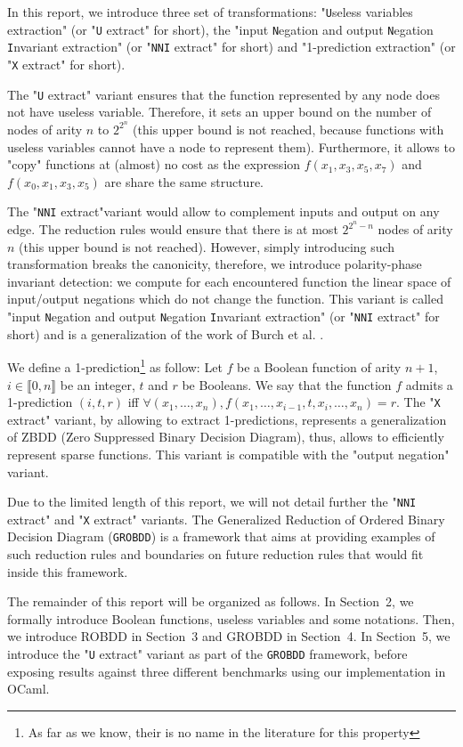 \documentclass[a4paper,10pt]{article}
\newcommand{\Uextract}{"\texttt{U}seless variables extraction"}
\newcommand{\uextract}{"\texttt{U} extract"}
\newcommand{\NNIextract}{"input \texttt{N}egation and output \texttt{N}egation \texttt{I}nvariant extraction"}
\newcommand{\nniextract}{"\texttt{NNI} extract"}
\newcommand{\Xextract}{"1-prediction extraction"}
\newcommand{\xextract}{"\texttt{X} extract"}
\newcommand{\GroBdd}{\texttt{GROBDD}}
\begin{document}
In this report, we introduce three set of transformations: \Uextract{} (or \uextract{} for short), the \NNIextract{} (or \nniextract{} for short) and \Xextract{} (or \xextract{} for short).


The \uextract{} variant ensures that the function represented by any node does not have useless variable.
Therefore, it sets an upper bound on the number of nodes of arity $n$ to $2^{2^n}$ (this upper bound is not reached, because functions with useless variables cannot have a node to represent them).
Furthermore, it allows to "copy" functions at (almost) no cost as the expression $f(x_1, x_3, x_5, x_7)$ and $f(x_0, x_1, x_3, x_5)$ are share the same structure.


The \nniextract variant would allow to complement inputs and output on any edge.
The reduction rules would ensure that there is at most $2^{2^n-n}$ nodes of arity $n$ (this upper bound is not reached).
However, simply introducing such transformation breaks the canonicity, therefore, we introduce polarity-phase invariant detection: we compute for each encountered function the linear space of input/output negations which do not change the function.
This variant is called \NNIextract{} (or \nniextract{} for short) and is a generalization of the work of Burch et al. \cite{BurchLong1992}.

We define a 1-prediction\footnote{As far as we know, their is no name in the literature for this property} as follow:
Let $f$ be a Boolean function of arity $n+1$, $i\in\llbracket 0, n\rrbracket$ be an integer, $t$ and $r$ be Booleans.
We say that the function $f$ admits a 1-prediction $(i, t, r)$ iff $\forall (x_1, \dots, x_n), f(x_1, \dots, x_{i-1}, t, x_i, \dots, x_n) = r$.
The \xextract{} variant, by allowing to extract 1-predictions, represents a generalization of ZBDD (Zero Suppressed Binary Decision Diagram), thus, allows to efficiently represent sparse functions.
This variant is compatible with the "output negation" variant.

Due to the limited length of this report, we will not detail further the \nniextract{} and \xextract{} variants.
The Generalized Reduction of Ordered Binary Decision Diagram (\GroBdd{}) is a framework that aims at providing examples of such reduction rules and boundaries on future reduction rules that would fit inside this framework.

The remainder of this report will be organized as follows.
In Section~2, we formally introduce Boolean functions, useless variables and some notations.
Then, we introduce ROBDD in Section~3 and GROBDD in Section~4.
In Section~5, we introduce the \uextract{} variant as part of the \GroBdd{} framework, before exposing results against three  different benchmarks \cite{BenchSatlib, BenchLgsynth91, BenchIscas99} using our implementation in OCaml.
\end{document}
